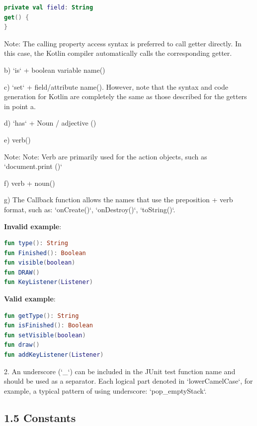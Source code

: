 \begin{lstlisting}[language=Kotlin]
private val field: String
get() {
}
\end{lstlisting}
Note: The calling property access syntax is preferred to call getter directly. In this case, the Kotlin compiler automatically calls the corresponding getter.



b) `is` + boolean variable name()



c) `set` + field/attribute name(). However, note that the syntax and code generation for Kotlin are completely the same as those described for the getters in point a.



d) `has` + Noun / adjective ()



e) verb()

Note: Note: Verb are primarily used for the action objects, such as `document.print ()`



f) verb + noun()



g) The Callback function allows the names that use the preposition + verb format, such as: `onCreate()`, `onDestroy()`, `toString()`.



\textbf{Invalid example}:



\begin{lstlisting}[language=Kotlin]
fun type(): String
fun Finished(): Boolean
fun visible(boolean)
fun DRAW()
fun KeyListener(Listener)
\end{lstlisting}


\textbf{Valid example}:



\begin{lstlisting}[language=Kotlin]
fun getType(): String
fun isFinished(): Boolean
fun setVisible(boolean)
fun draw()
fun addKeyListener(Listener)
\end{lstlisting}


2.	An underscore (`_`) can be included in the JUnit test function name and should be used as a separator. Each logical part denoted in `lowerCamelCase`, for example, a typical pattern of using underscore: `pop_emptyStack`.

\subsection*{\textbf{1.5 Constants}}

